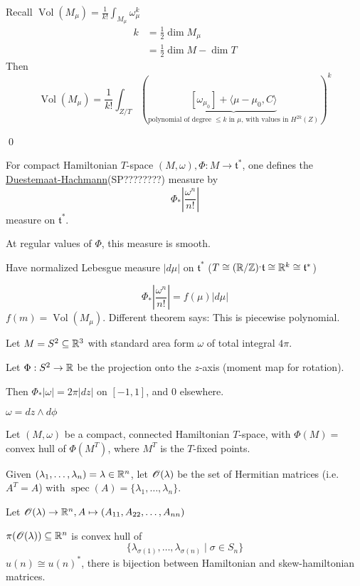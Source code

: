 \documentclass[x11names,reqno,14pt]{extarticle}
\newcommand{\mk}[1]{\mathfrak{#1}}
\renewcommand{\t}{\mk{t}}
\begin{document}
Recall $\operatorname{Vol}(M_\mu) = \frac{1}{k!}\int_{M_\mu}\omega_\mu^k$
\begin{align*}
k & = \frac12\dim M_\mu \\
& = \frac12\dim M - \dim T
\end{align*}
Then 
\[
\operatorname{Vol}(M_\mu) = \frac{1}{k!}\int_{Z/T}\left(\underbrace{[\omega_{\mu_0}] + \langle\mu-\mu_0,C\rangle}_{\text{polynomial of degree $\leq k$ in $\mu$, with values in $H^{2k}(Z)$}}\right)^k
\]

\proof

\qed


For compact Hamiltonian $T$-space $(M,\omega),\Phi:M\to\t^*$, one defines the \underline{Duestemaat-Hachmann}(SP????????) measure by
\[
\Phi_*|\frac{\omega^n}{n!}|
\]
measure on $\t^*$.

At regular values of $\Phi$, this measure is smooth. 

Have normalized Lebesgue measure $|d\mu|$ on $\t^*$ ($T \cong (\R/\Z)^, \t \cong \R^k \cong \t^*$)

\[
\Phi_*|\frac{\omega^n}{n!}| = f(\mu)|d\mu|
\]
$f(m) = \operatorname{Vol}(M_\mu)$. Different theorem says: This is piecewise polynomial. 

\exm[Archimedes?]

Let $M = S^2\subseteq\mathbb{R}^3$ with standard area form $\omega$ of total integral $4\pi$. 

Let $\Phi:S^2\to\mathbb{R}$ be the projection onto the $z$-axis (moment map for rotation). 

Then $\Phi_*|\omega| = 2\pi|dz|$ on $[-1,1]$, and 0 elsewhere.

$\omega = dz\wedge d\phi$


Let $(M,\omega)$ be a compact, connected Hamiltonian $T$-space, with $\Phi(M) = $convex hull of $\Phi(M^T)$, where $M^T$ is the $T$-fixed points. 

\exm

Given $(\lambda_1,\dots,\lambda_n) = \lambda \in \mathbb{R}^n$, let $\mathscr{O}(\lambda)$ be the set of Hermitian matrices (i.e. $A^T= A$) with $\operatorname{spec}(A) = \{\lambda_1,\dots,\lambda_n\}$.

Let $\mathscr{O}(\lambda)\to\mathbb{R}^n, A \mapsto (A_{11},A_{22},\dots,A_{nn})$

$\pi(\mathscr{O}(\lambda))\subseteq\mathbb{R}^n$ is convex hull of 
\[
\{\lambda_{\sigma(1)},\dots,\lambda_{\sigma(n)}\mid\sigma\in S_n \}
\]
$u(n) \cong u(n)^*$, there is bijection between Hamiltonian and skew-hamiltonian matrices. 
\end{document}
